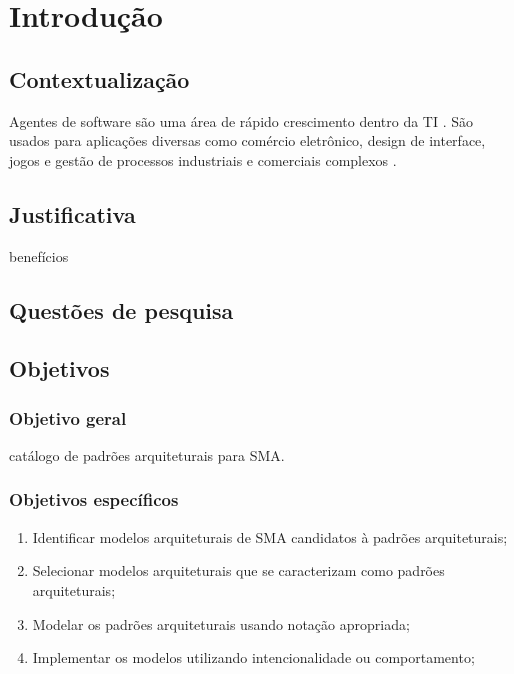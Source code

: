 \chapter[Introdução]{Introdução}\label{ch:introducao}

\section{Contextualização}

Agentes de software são uma área de rápido crescimento dentro da TI \cite{jennings1996}. São usados para aplicações diversas como comércio eletrônico, design de interface, jogos e gestão de processos industriais e comerciais complexos \cite{jennings1996}.



\section{Justificativa}

benefícios

\section{Questões de pesquisa}

\section{Objetivos}

\subsection{Objetivo geral}

catálogo de padrões
arquiteturais para SMA.

\subsection{Objetivos específicos}

\begin{enumerate}
    \item Identificar modelos arquiteturais de SMA candidatos à padrões arquiteturais;
    \item Selecionar modelos arquiteturais que se caracterizam como padrões arquiteturais; 
    \item Modelar os padrões arquiteturais usando notação apropriada;
    \item Implementar os modelos utilizando intencionalidade ou comportamento;
\end{enumerate}

